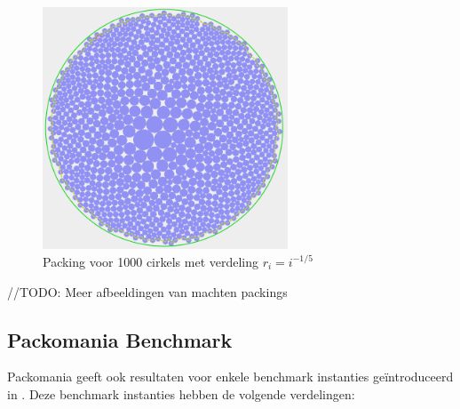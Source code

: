 \documentclass[12pt,a4paper,oneside]{book}
\begin{document}
\begin{figure}
  \centering
  \includegraphics[width=0.65\textwidth]{packing-neg1div5-1000.png}
  \caption{Packing voor 1000 cirkels met verdeling $r_i=i^{-1/5}$} \label{fig:packing-neg1div5-1000} 
\end{figure}

//TODO: Meer afbeeldingen van machten packings

\subsection{Packomania Benchmark}

Packomania geeft ook resultaten voor enkele benchmark instanties geïntroduceerd in \cite{huang2006new}.
Deze benchmark instanties hebben de volgende verdelingen:
\end{document}
